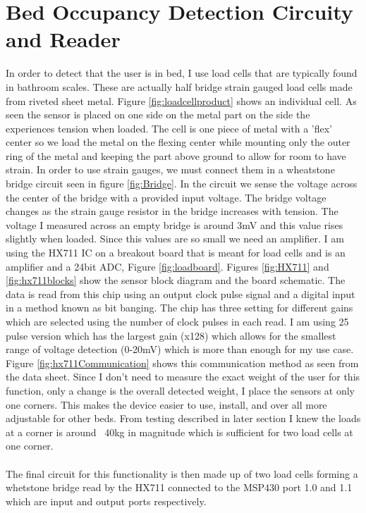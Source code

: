 \documentclass[11pt]{article}
\begin{document}
\section{Bed Occupancy Detection Circuity and Reader}
In order to detect that the user is in bed, I use load cells that are typically found in bathroom scales. 
These are actually half bridge strain gauged load cells made from riveted sheet metal. 
Figure \ref{fig:loadcellproduct} shows an individual cell.
As seen the sensor is placed on one side on the metal part on the side the experiences tension when loaded.
The cell is one piece of metal with a 'flex' center so we load the metal on the flexing center while mounting only the outer ring of the metal and keeping the part above ground to allow for room to have strain.
In order to use strain gauges, we must connect them in a wheatstone bridge circuit seen in figure \ref{fig:Bridge}. 
In the circuit we sense the voltage across the center of the bridge with a provided input voltage. 
The bridge voltage changes as the strain gauge resistor in the bridge increases with tension. 
The voltage I measured across an empty bridge is around 3mV and this value rises slightly when loaded. 
Since this values are so small we need an amplifier.
I am using the HX711 IC on a breakout board that is meant for load cells and is an amplifier and a 24bit ADC, Figure \ref{fig:loadboard}. 
Figures \ref{fig:HX711} and \ref{fig:hx711blocks} show the sensor block diagram and the board schematic.
The data is read from this chip using an output clock pulse signal and a digital input in a method known as bit banging.  
The chip has three setting for different gains which are selected using the number of clock pulses in each read. 
I am using 25 pulse version which has the largest gain (x128) which allows for the smallest range of voltage detection (0-20mV) which is more than enough for my use case.
Figure \ref{fig:hx711Communication} shows this communication method as seen from the data sheet.
Since I don't need to measure the exact weight of the user for this function, only a change is the overall detected weight, I place the sensors at only one corners. 
This makes the device easier to use, install, and over all more adjustable for other beds.
From testing described in later section I knew the loads at a corner is around ~40kg in magnitude which is sufficient for two load cells at one corner.\\
\\
The final circuit for this functionality is then made up of two load cells forming a whetstone bridge read by the HX711 connected to the MSP430 port 1.0 and 1.1 which are input and output ports respectively.
\end{document}
